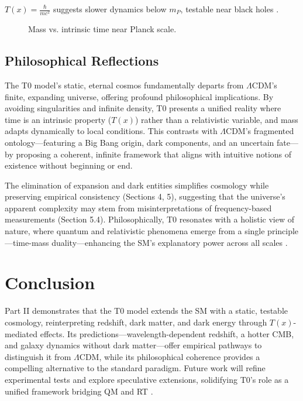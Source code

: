 \documentclass[twocolumn,aps,prl]{revtex4-2}
\newcommand{\Tfield}{T(x)}
\begin{document}
	\(\Tfield = \frac{\hbar}{m c^2}\) suggests slower dynamics below \(m_P\), testable near black holes \cite{pascher_planck_2025}.
	
	\begin{figure}[ht]
		\centering
		\caption{Mass vs. intrinsic time near Planck scale.}
		\label{fig:mass_time}
	\end{figure}
	
	\subsection{Philosophical Reflections}
	\label{subsec:philosophical_reflections}
	
	The T0 model’s static, eternal cosmos fundamentally departs from \(\Lambda\)CDM’s finite, expanding universe, offering profound philosophical implications. By avoiding singularities and infinite density, T0 presents a unified reality where time is an intrinsic property (\(\Tfield\)) rather than a relativistic variable, and mass adapts dynamically to local conditions. This contrasts with \(\Lambda\)CDM’s fragmented ontology—featuring a Big Bang origin, dark components, and an uncertain fate—by proposing a coherent, infinite framework that aligns with intuitive notions of existence without beginning or end.
	
	The elimination of expansion and dark entities simplifies cosmology while preserving empirical consistency (Sections 4, 5), suggesting that the universe’s apparent complexity may stem from misinterpretations of frequency-based measurements (Section 5.4). Philosophically, T0 resonates with a holistic view of nature, where quantum and relativistic phenomena emerge from a single principle—time-mass duality—enhancing the SM’s explanatory power across all scales \cite{pascher_perspective_2025}.
	
	\section{Conclusion}
	\label{sec:conclusion}
	
	Part II demonstrates that the T0 model extends the SM with a static, testable cosmology, reinterpreting redshift, dark matter, and dark energy through \(\Tfield\)-mediated effects. Its predictions—wavelength-dependent redshift, a hotter CMB, and galaxy dynamics without dark matter—offer empirical pathways to distinguish it from \(\Lambda\)CDM, while its philosophical coherence provides a compelling alternative to the standard paradigm. Future work will refine experimental tests and explore speculative extensions, solidifying T0’s role as a unified framework bridging QM and RT \cite{pascher_perspective_2025}.
	
\end{document}
